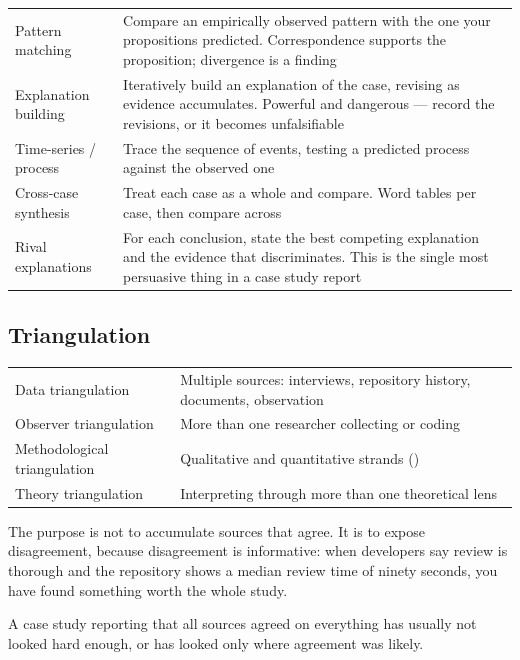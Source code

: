 \begin{center}
\small
\begin{tabular}{@{}L{3.4cm}L{10.9cm}@{}}
\toprule
Pattern matching
  & Compare an empirically observed pattern with the one your propositions
    predicted. Correspondence supports the proposition; divergence is a
    finding \\
Explanation building
  & Iteratively build an explanation of the case, revising as evidence
    accumulates. Powerful and dangerous --- record the revisions, or it becomes
    unfalsifiable \\
Time-series / process
  & Trace the sequence of events, testing a predicted process against the
    observed one \\
Cross-case synthesis
  & Treat each case as a whole and compare. Word tables per case, then compare
    across \\
Rival explanations
  & For each conclusion, state the best competing explanation and the evidence
    that discriminates. This is the single most persuasive thing in a case
    study report \\
\bottomrule
\end{tabular}
\end{center}

\subsection{Triangulation}

\begin{center}
\small
\begin{tabular}{@{}L{3.0cm}L{11.3cm}@{}}
\toprule
Data triangulation        & Multiple sources: interviews, repository history,
                            documents, observation \\
Observer triangulation    & More than one researcher collecting or coding \\
Methodological triangulation & Qualitative and quantitative strands
                            () \\
Theory triangulation      & Interpreting through more than one theoretical lens \\
\bottomrule
\end{tabular}
\end{center}

\begin{pitfall}
The purpose is not to accumulate sources that agree. It is to expose
disagreement, because disagreement is informative: when developers say review
is thorough and the repository shows a median review time of ninety seconds,
you have found something worth the whole study.

\medskip
A case study reporting that all sources agreed on everything has usually not
looked hard enough, or has looked only where agreement was likely.
\end{pitfall}

